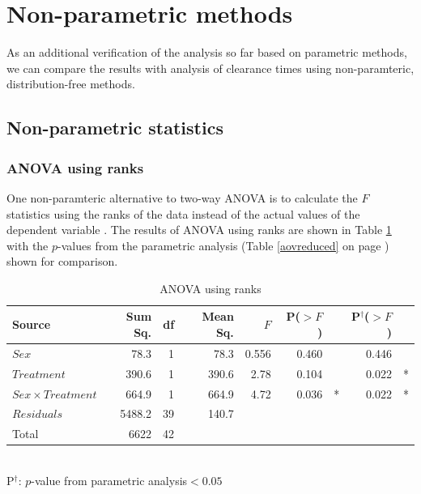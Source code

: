 
\clearpage
\section{Non-parametric methods}
As an additional verification of the analysis so far based on parametric methods, we can compare the results with analysis of clearance times using non-paramteric, distribution-free methods.

\subsection{Non-parametric statistics}
\subsubsection*{ANOVA using ranks}
One non-paramteric alternative to two-way ANOVA is to calculate the $F$ statistics using the ranks of the data instead of the actual values of the dependent variable \cite{conover}. The results of ANOVA using ranks are shown in Table \ref{aovranks} with the $p$-values from the parametric analysis (Table \ref{aovreduced} on page \pageref{aovreduced}) shown for comparison.
\begin{table}[h]
\centering
\caption{ANOVA using ranks}\label{aovranks}
\begin{tabular}{l|rrrrrl|rl}
Source&Sum Sq.&df&Mean Sq.&$F$&P($>F$)&&P$^{\dag}$($>F$)\\
\hline
$Sex$				& 78.3 & 1 & 78.3 & 0.556 &  0.460 && 0.446& \\
$Treatment$			& 390.6   & 1 & 390.6   & 2.78 & 0.104&  & 0.022&* \\
$Sex\times Treatment$	& 664.9   & 1 & 664.9   & 4.72 & 0.036&*   & 0.022&* \\
$Residuals$			& 5488.2 & 39 & 140.7 &&&&\\
\hline
Total&6622&42&&&&
\end{tabular}\\
P$^{\dag}$: $p$-value from parametric analysis\qquad*$<0.05$
\end{table}

